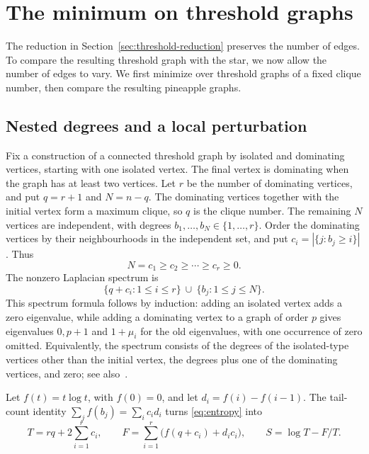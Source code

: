 \documentclass[11pt,a4paper,reqno]{amsart}
\theoremstyle{remark}
\newcommand{\Ent}{S}
\numberwithin{equation}{section}
\begin{document}
\section{The minimum on threshold graphs}\label{sec:threshold-minimum}
The reduction in Section~\ref{sec:threshold-reduction} preserves the number
of edges. To compare the resulting threshold graph with the star, we now
allow the number of edges to vary. We first minimize over threshold
graphs of a fixed clique number, then compare the resulting pineapple graphs.

\subsection{Nested degrees and a local perturbation}\label{subsec:ordered-polytope}
Fix a construction of a connected threshold graph by isolated and
dominating vertices, starting with one isolated vertex. The final vertex
is dominating when the graph has at least two vertices. Let $r$ be
the number of dominating vertices, and put $q=r+1$ and $N=n-q$.
The dominating vertices together with the initial vertex form a maximum
clique, so $q$ is the clique number. The remaining $N$ vertices are
independent, with degrees $b_1,\ldots,b_N\in\{1,\ldots,r\}$.
Order the dominating vertices by their neighbourhoods in the independent
set, and put
$c_i=|\{j:b_j\ge i\}|$. Thus
\begin{equation}\label{eq:ordered-domain}
 N=c_1\ge c_2\ge\cdots\ge c_r\ge0.
\end{equation}
The nonzero Laplacian spectrum is
\begin{equation}\label{eq:threshold-spectrum}
 \{q+c_i:1\le i\le r\}\ \cup\ \{b_j:1\le j\le N\}.
\end{equation}
This spectrum formula follows by induction: adding an isolated vertex
adds a zero eigenvalue, while adding
a dominating vertex to a graph of order $p$ gives eigenvalues $0,p+1$
and $1+\mu_i$ for the old eigenvalues, with one occurrence of zero omitted.
Equivalently,
the spectrum consists of the degrees of the isolated-type vertices
other than the initial vertex, the degrees plus one of the dominating
vertices, and zero; see also~\cite[Section 10]{Csikvari2011}.

Let $f(t)=t\log t$, with $f(0)=0$, and let
$d_i=f(i)-f(i-1)$. The tail-count identity
$\sum_j f(b_j)=\sum_i c_i d_i$ turns \eqref{eq:entropy} into
\begin{equation}\label{eq:TF-general}
 T=rq+2\sum_{i=1}^r c_i,\qquad
 F=\sum_{i=1}^r\bigl(f(q+c_i)+d_i c_i\bigr),\qquad
 \Ent=\log T-F/T.
\end{equation}
\end{document}
